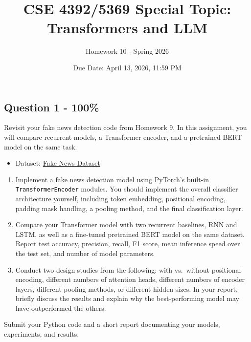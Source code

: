 \documentclass{article}
\begin{document}
\title{CSE 4392/5369 Special Topic: Transformers and LLM}
\author{Homework 10 - Spring 2026}
\date{Due Date: April 13, 2026, 11:59 PM}
\maketitle
\thispagestyle{fancy}


\subsection*{Question 1 - 100\%}

Revisit your fake news detection code from Homework 9. In this assignment, you will compare recurrent models, a Transformer encoder, and a pretrained BERT model on the same task.
\begin{itemize}
    \item Dataset: \href{https://www.kaggle.com/datasets/emineyetm/fake-news-detection-datasets/data}{Fake News Dataset}
\end{itemize}
\begin{enumerate}
    \item Implement a fake news detection model using PyTorch's built-in \texttt{TransformerEncoder} modules. You should implement the overall classifier architecture yourself, including token embedding, positional encoding, padding mask handling, a pooling method, and the final classification layer.

    \item Compare your Transformer model with two recurrent baselines, RNN and LSTM, as well as a fine-tuned pretrained BERT model on the same dataset. Report test accuracy, precision, recall, F1 score, mean inference speed over the test set, and number of model parameters.
    
    \item Conduct two design studies from the following: with vs.\ without positional encoding, different numbers of attention heads, different numbers of encoder layers, different pooling methods, or different hidden sizes. In your report, briefly discuss the results and explain why the best-performing model may have outperformed the others.
\end{enumerate}

Submit your Python code and a short report documenting your models, experiments, and results.

\vspace{0.8em}
\end{document}
